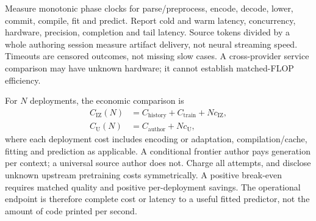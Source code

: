 Measure monotonic phase clocks for parse/preprocess, encode, decode, lower,
commit, compile, fit and predict. Report cold and warm latency, concurrency,
hardware, precision, completion and tail latency. Source tokens divided by a
whole authoring session measure artifact delivery, not neural streaming speed.
Timeouts are censored outcomes, not missing slow cases. A cross-provider service
comparison may have unknown hardware; it cannot establish matched-FLOP efficiency.

For $N$ deployments, the economic comparison is
\begin{align}
 C_{\mathrm{IZ}}(N)&=C_{\mathrm{history}}+C_{\mathrm{train}}+N c_{\mathrm{IZ}},\\
 C_{\mathrm{U}}(N)&=C_{\mathrm{author}}+N c_{\mathrm{U}},
\end{align}
where each deployment cost includes encoding or adaptation, compilation/cache,
fitting and prediction as applicable. A conditional frontier author pays
generation per context; a universal source author does not. Charge all attempts,
and disclose unknown upstream pretraining costs symmetrically. A positive
break-even requires matched quality and positive per-deployment savings. The
operational endpoint is therefore complete cost or latency to a useful fitted
predictor, not the amount of code printed per second.

